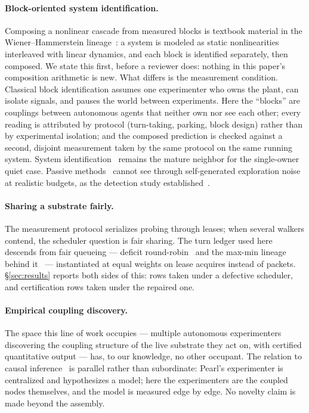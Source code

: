 \documentclass[11pt,a4paper]{article}
\begin{document}
\paragraph{Block-oriented system identification.}
Composing a nonlinear cascade from measured blocks is textbook
material in the Wiener--Hammerstein lineage~\cite{wiener1958,giri2010}:
a system is modeled as static nonlinearities interleaved with linear
dynamics, and each block is identified separately, then composed. We
state this first, before a reviewer does: nothing in this paper's
composition arithmetic is new. What differs is the measurement
condition. Classical block identification assumes one experimenter who
owns the plant, can isolate signals, and pauses the world between
experiments. Here the ``blocks'' are couplings between autonomous
agents that neither own nor see each other; every reading is
attributed by protocol (turn-taking, parking, block design) rather
than by experimental isolation; and the composed prediction is checked
against a second, disjoint measurement taken by the same protocol on
the same running system. System
identification~\cite{ljung1999sid} remains the mature neighbor for
the single-owner quiet case. Passive
methods~\cite{sugihara2012ccm} cannot see through self-generated
exploration noise at realistic budgets, as the detection study
established~\cite{p1}.

\paragraph{Sharing a substrate fairly.}
The measurement protocol serializes probing through leases; when
several walkers contend, the scheduler question is fair sharing.
The turn ledger used here descends from fair queueing --- deficit
round-robin~\cite{shreedhar1995} and the max-min lineage behind
it~\cite{demers1990} --- instantiated at equal weights on lease
acquires instead of packets. \S\ref{sec:results} reports both sides of
this: rows taken under a defective scheduler, and certification rows
taken under the repaired one.

\paragraph{Empirical coupling discovery.}
The space this line of work occupies --- multiple autonomous
experimenters discovering the coupling structure of the live substrate
they act on, with certified quantitative output --- has, to our
knowledge, no other occupant. The relation to causal
inference~\cite{pearl2009causality} is parallel rather than
subordinate: Pearl's experimenter is centralized and hypothesizes a
model; here the experimenters are the coupled nodes themselves, and
the model is measured edge by edge. No novelty claim is made beyond
the assembly.
\end{document}
